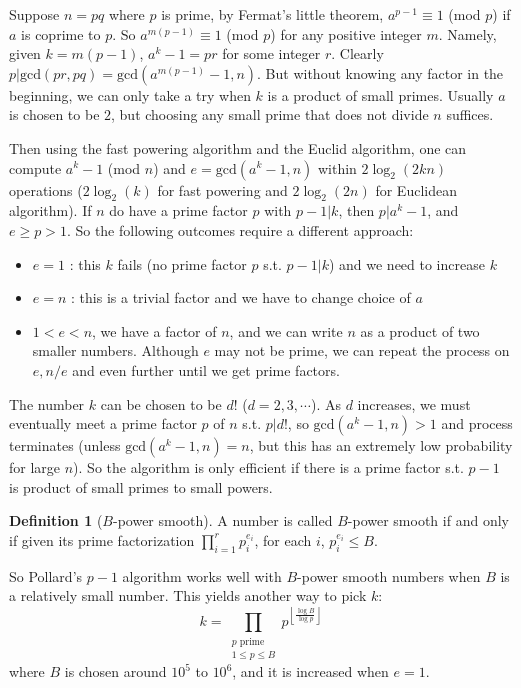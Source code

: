 \documentclass[12pt]{article}
\theoremstyle{remark}
\theoremstyle{definition}
\newtheorem{definition}{Definition}[subsection]
\begin{document}
        Suppose $n = pq$ where $p$ is prime, by Fermat's little theorem, $a^{p-1} \equiv 1$ (mod $p$) if $a$ is coprime to $p$. So $a^{m(p-1)} \equiv 1$ (mod $p$) for any positive integer $m$. Namely, given $k = m(p-1)$, $a^{k} - 1 = pr$ for some integer $r$. Clearly $p | \text{gcd}(pr, pq) = \text{gcd}(a^{m(p-1)} - 1, n)$. But without knowing any factor in the beginning, we can only take a try when $k$ is a product of small primes. Usually $a$ is chosen to be $2$, but choosing any small prime that does not divide $n$ suffices.
        
        Then using the fast powering algorithm and the Euclid algorithm, one can compute $a^k - 1 $ (mod $n$) and $e= \text{gcd}(a^k - 1, n)$ within $2 \log_2(2kn)$ operations ($2 \log_2(k)$ for fast powering and $2 \log_2(2n)$ for Euclidean algorithm). If $n$ do have a prime factor $p$ with $p-1 | k$, then $p | a^k - 1$, and $e \geq p > 1$. So the following outcomes require a different approach: 
        \begin{itemize}
            \item $e = 1$ : this $k$ fails (no prime factor $p$ s.t. $p-1|k$) and we need to increase $k$
            \item $e = n$ : this is a trivial factor and we have to change choice of $a$
            \item $1 < e < n$, we have a factor of $n$, and we can write $n$ as a product of two smaller numbers. Although $e$ may not be prime, we can repeat the process on $e, n/e$ and even further until we get prime factors. 
        \end{itemize}
        The number $k$ can be chosen to be $d!$ ($d = 2, 3, \cdots$). As $d$ increases, we must eventually meet a prime factor $p$ of $n$ s.t. $p | d!$, so $\text{gcd}(a^k - 1, n) > 1$ and process terminates (unless $\text{gcd}(a^k - 1, n) = n$, but this has an extremely low probability for large $n$). So the algorithm is only efficient if there is a prime factor s.t. $p-1$ is product of small primes to small powers.

        \begin{definition}[$B$-power smooth]
            A number is called $B$-power smooth if and only if given its prime factorization $\prod^r_{i=1} p_i^{e_i}$, for each $i$, $p_i^{e_i} \leq B$.
        \end{definition}

        So Pollard's $p-1$ algorithm works well with $B$-power smooth numbers when $B$ is a relatively small number. This yields another way to pick $k$: 
        $$k = \prod_{\substack{p\text{ prime}\\ 1 \leq p \leq B}} p^{\left\lfloor \frac{\log{B}}{\log{p}} \right\rfloor}$$
        where $B$ is chosen around $10^5$ to $10^6$, and it is increased when $e=1$.
        
\end{document}
